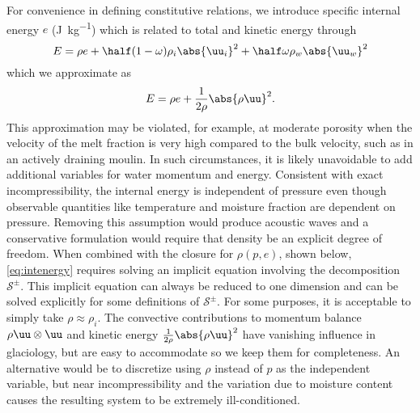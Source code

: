 For convenience in defining constitutive relations, we introduce specific internal energy $e$ (\si{\joule\per\kilogram}) which is related to total and kinetic energy through
\begin{equation*}
  E = \rho e + \half (1-\omega) \rho_i \abs{\uu_i}^2 + \half \omega \rho_w \abs{\uu_w}^2
\end{equation*}
which we approximate as
\begin{equation}\label{eq:intenergy}
  E = \rho e +  \frac{1}{2\rho} \abs{\rho\uu}^2 .
\end{equation}
This approximation may be violated, for example, at moderate porosity when the velocity of the melt fraction is very high compared to the bulk velocity, such as in an actively draining moulin.
In such circumstances, it is likely unavoidable to add additional variables for water momentum and energy.
Consistent with exact incompressibility, the internal energy is independent of pressure even though observable quantities like temperature and moisture fraction are dependent on pressure.
Removing this assumption would produce acoustic waves and a conservative formulation would require that density be an explicit degree of freedom.
When combined with the closure for $\rho(p,e)$, shown below, \eqref{eq:intenergy} requires solving an implicit equation involving the decomposition $\mathcal S^\pm$.
This implicit equation can always be reduced to one dimension and can be solved explicitly for some definitions of $\mathcal S^\pm$.
For some purposes, it is acceptable to simply take $\rho \approx \rho_i$.
The convective contributions to momentum balance $\rho\uu\otimes\uu$ and kinetic energy $\frac{1}{2\rho}\abs{\rho\uu}^2$ have vanishing influence in glaciology, but are easy to accommodate so we keep them for completeness.
An alternative would be to discretize using $\rho$ instead of $p$ as the independent variable, but near incompressibility and the variation due to moisture content causes the resulting system to be extremely ill-conditioned.

